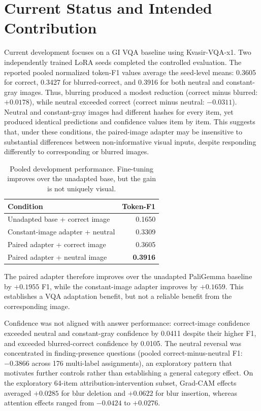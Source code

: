 \documentclass[letterpaper]{article}
\begin{document}
\section{Current Status and Intended Contribution}

Current development focuses on a GI VQA baseline using Kvasir-VQA-x1. Two independently trained LoRA seeds completed the controlled evaluation. The reported pooled normalized token-F1 values average the seed-level means: 0.3605 for correct, 0.3427 for blurred-correct, and 0.3916 for both neutral and constant-gray images. Thus, blurring produced a modest reduction (correct minus blurred: $+0.0178$), while neutral exceeded correct (correct minus neutral: $-0.0311$). Neutral and constant-gray images had different hashes for every item, yet produced identical predictions and confidence values item by item. This suggests that, under these conditions, the paired-image adapter may be insensitive to substantial differences between non-informative visual inputs, despite responding differently to corresponding or blurred images.

\begin{table}[t]
\centering
\small
\caption{Pooled development performance. Fine-tuning improves over the unadapted base, but the gain is not uniquely visual.}
\label{tab:performance}
\begin{tabular}{lr}
\toprule
\textbf{Condition} & \textbf{Token-F1} \\
\midrule
Unadapted base + correct image & 0.1650 \\
Constant-image adapter + neutral & 0.3309 \\
Paired adapter + correct image & 0.3605 \\
Paired adapter + neutral image & \textbf{0.3916} \\
\bottomrule
\end{tabular}
\end{table}

The paired adapter therefore improves over the unadapted PaliGemma baseline by $+0.1955$ F1, while the constant-image adapter improves by $+0.1659$. This establishes a VQA adaptation benefit, but not a reliable benefit from the corresponding image.

Confidence was not aligned with answer performance: correct-image confidence exceeded neutral and constant-gray confidence by 0.0411 despite their higher F1, and exceeded blurred-correct confidence by 0.0105. The neutral reversal was concentrated in finding-presence questions (pooled correct-minus-neutral F1: $-0.3866$ across 176 multi-label assignments), an exploratory pattern that motivates further controls rather than establishing a general category effect. On the exploratory 64-item attribution-intervention subset, Grad-CAM effects averaged $+0.0285$ for blur deletion and $+0.0622$ for blur insertion, whereas attention effects ranged from $-0.0424$ to $+0.0276$.
\end{document}
